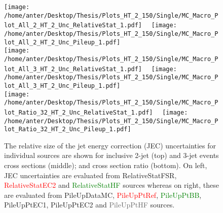 \begin{figure}[!hbtp]
\hspace*{-5mm}\texttt{[image: /home/anter/Desktop/Thesis/Plots\_HT\_2\_150/Single/MC\_Macro\_Plot\_All\_2\_HT\_2\_Unc\_RelativeStat\_1.pdf]}%
~~\texttt{[image: /home/anter/Desktop/Thesis/Plots\_HT\_2\_150/Single/MC\_Macro\_Plot\_All\_2\_HT\_2\_Unc\_Pileup\_1.pdf]}\\
\hspace*{-5mm}\texttt{[image: /home/anter/Desktop/Thesis/Plots\_HT\_2\_150/Single/MC\_Macro\_Plot\_All\_3\_HT\_2\_Unc\_RelativeStat\_1.pdf]}%
~~\texttt{[image: /home/anter/Desktop/Thesis/Plots\_HT\_2\_150/Single/MC\_Macro\_Plot\_All\_3\_HT\_2\_Unc\_Pileup\_1.pdf]}\\
\hspace*{-5mm}\texttt{[image: /home/anter/Desktop/Thesis/Plots\_HT\_2\_150/Single/MC\_Macro\_Plot\_Ratio\_32\_HT\_2\_Unc\_RelativeStat\_1.pdf]}%
~~\texttt{[image: /home/anter/Desktop/Thesis/Plots\_HT\_2\_150/Single/MC\_Macro\_Plot\_Ratio\_32\_HT\_2\_Unc\_Pileup\_1.pdf]}
\caption{The relative size of the jet energy correction (JEC) uncertainties for individual sources are shown for inclusive 2-jet (top) and 3-jet events cross sections (middle); and cross section ratio \ratio (bottom). On left, JEC uncertainties are evaluated from \textcolor{blue2}{RelativeStatFSR}, \textcolor{red}{RelativeStatEC2} and \textcolor{green}{RelativeStatHF} sources whereas on right, these are evaluated from \textcolor{blue2}{PileUpDataMC}, \textcolor{red}{PileUpPtRef}, \textcolor{green}{PileUpPtBB}, \textcolor{pink2}{PileUpPtEC1}, \textcolor{deepsaffron}{PileUpPtEC2} and \textcolor{dimgray}{PileUpPtHF} sources.}
\label{fig:jes3}
\end{figure}

